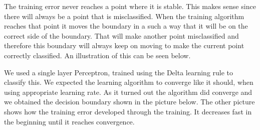 \documentclass[a4paper]{article}
\begin{document}
The training error never reaches a point where it is stable. This makes sense since there will always be a point that is misclassified. When the training algorithm reaches that point it moves the boundary in a such a way that it will be on the correct side of the boundary. That will make another point misclassified and therefore this boundary will always keep on moving to make the current point correctly classified. An illustration of this can be seen below.

We used a single layer Perceptron, trained using the Delta learning rule to classify this. We expected the learning algorithm to converge like it should, when using appropriate learning rate. As it turned out the algorithm did converge and we obtained the decision boundary shown in the picture below. The other picture shows how the training error developed through the training. It decreases fast in the beginning until it reaches convergence.
\end{document}
